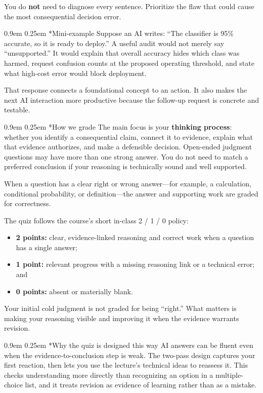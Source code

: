 \documentclass[10pt]{article}
\makeatletter
\renewcommand\section{\@startsection{section}{1}{\z@}%
  {0.9em}%
  {0.25em}%
  {\normalfont\large\bfseries}}
\makeatother
\begin{document}
You do \textbf{not} need to diagnose every sentence. Prioritize the flaw that could cause the most consequential decision error.

\section*{Mini-example}
Suppose an AI writes: ``The classifier is 95\% accurate, so it is ready to deploy.'' A useful audit would not merely say ``unsupported.'' It would explain that overall accuracy hides which class was harmed, request confusion counts at the proposed operating threshold, and state what high-cost error would block deployment.

That response connects a foundational concept to an action. It also makes the next AI interaction more productive because the follow-up request is concrete and testable.

\section*{How we grade}
The main focus is your \textbf{thinking process}: whether you identify a consequential claim, connect it to evidence, explain what that evidence authorizes, and make a defensible decision. Open-ended judgment questions may have more than one strong answer. You do not need to match a preferred conclusion if your reasoning is technically sound and well supported.

When a question has a clear right or wrong answer---for example, a calculation, conditional probability, or definition---the answer and supporting work are graded for correctness.

The quiz follows the course's short in-class 2 / 1 / 0 policy:

\begin{itemize}
  \item \textbf{2 points:} clear, evidence-linked reasoning and correct work when a question has a single answer;
  \item \textbf{1 point:} relevant progress with a missing reasoning link or a technical error; and
  \item \textbf{0 points:} absent or materially blank.
\end{itemize}

Your initial cold judgment is not graded for being ``right.'' What matters is making your reasoning visible and improving it when the evidence warrants revision.

\section*{Why the quiz is designed this way}
AI answers can be fluent even when the evidence-to-conclusion step is weak. The two-pass design captures your first reaction, then lets you use the lecture's technical ideas to reassess it. This checks understanding more directly than recognizing an option in a multiple-choice list, and it treats revision as evidence of learning rather than as a mistake.
\end{document}
